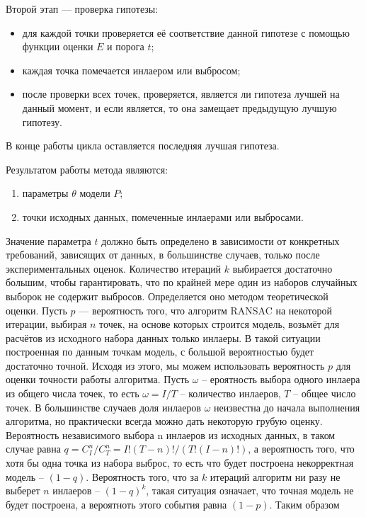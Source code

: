 Второй этап — проверка гипотезы:

\begin{itemize}
	\item для каждой точки проверяется её соответствие данной гипотезе с помощью функции оценки $E$ и порога $t$;
	\item каждая точка помечается инлаером или выбросом;
	\item после проверки всех точек, проверяется, является ли гипотеза лучшей на данный момент, и если является, то она замещает предыдущую лучшую гипотезу.
\end{itemize}

В конце работы цикла оставляется последняя лучшая гипотеза.

Результатом работы метода являются:

\begin{enumerate}
	\item параметры $\theta$ модели $P$; 
	\item точки исходных данных, помеченные инлаерами или выбросами.
\end{enumerate} 

Значение параметра $t$ должно быть определено в зависимости от конкретных требований, зависящих от данных, в большинстве случаев, только после экспериментальных оценок. Количество итераций $k$ выбирается достаточно большим, чтобы гарантировать, что по крайней мере один из наборов случайных выборок не содержит выбросов. Определяется оно методом теоретической оценки. Пусть $p$ — вероятность того, что алгоритм RANSAC на некоторой итерации, выбирая $n$ точек, на основе которых строится модель, возьмёт для расчётов из исходного набора данных только инлаеры. В такой ситуации построенная по данным точкам модель, с большой вероятностью будет достаточно точной. Исходя из этого, мы можем использовать вероятность $p$ для оценки точности работы алгоритма. Пусть $\omega$ -- ероятность выбора одного инлаера из общего числа точек, то есть $\omega=I/T$ -- количество инлаеров, $T$ -- общее число точек. В большинстве случаев доля инлаеров $\omega$ неизвестна до начала выполнения алгоритма, но практически всегда можно дать некоторую грубую оценку. Вероятность независимого выбора n инлаеров из исходных данных, в таком случае равна $q = C^n_I/C^n_T=I!(T-n)!/(T!(I-n)!)$, а вероятность того, что хотя бы одна точка из набора выброс, то есть что будет построена некорректная модель -- $(1-q)$. Вероятность того, что за $k$ итераций алгоритм ни разу не выберет $n$ инлаеров -- $(1−q)^k$, такая ситуация означает, что точная модель не будет построена, а вероятноть этого события равна $(1−p)$. Таким образом

